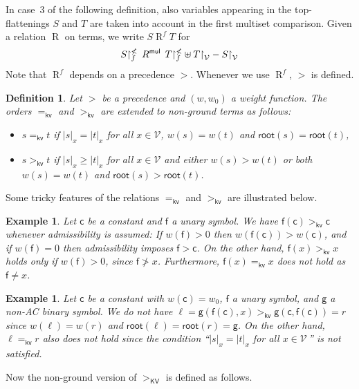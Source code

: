 \documentclass{tlp}
\newtheorem{definition}[theorem]{Definition}
\newtheorem{example}[theorem]{Example}
\newcommand{\m}[1]{\mathsf{#1}}
\newcommand{\mc}[1]{\mathcal{#1}}
\newcommand{\mr}[1]{\mathrm{#1}}
\newcommand{\rt}{\m{root}}
\newcommand{\Wt}{\m{w,root}}
\renewcommand{\Wt}{\m{kv}}
\newcommand{\mul}{\m{mul}}
\newcommand{\VV}{\mc{V}}
\newcommand{\KV}{\mr{\m{KV}}}
\newcommand{\rrs}[3][f]{{#2}{\restriction}^{\smash{#3}}_{#1}}
\newcommand{\REL}{\mathrel{R}}
\begin{document}
In case~3 of the following definition, also variables appearing
in the top\hyp flattenings $S$ and $T$ are taken into account in the
first multiset comparison.
Given a relation $\REL$ on terms, we write 
$S \REL^f T$ for
\[
\rrs{S}{\nless}\,\REL^\mul\,\rrs{T}{\nless}
\uplus T{\restriction}_\VV - S{\restriction}_\VV
\]
Note that $\REL^f$ depends on a precedence $>$. Whenever we
use $\REL^f$, $>$ is defined.

\begin{definition}
\label{def:kv}
Let $>$ be a precedence and $(w,w_0)$ a weight function.
The orders $=_\Wt$ and $>_\Wt$ are extended to non-ground terms
as follows:
\begin{itemize}
\item
$s =_\Wt t$ if $|s|_x = |t|_x$ for all $x \in \VV$,
$w(s) = w(t)$ and $\rt(s) = \rt(t)$,
\item
$s >_\Wt t$ if $|s|_x \geqslant |t|_x$ for all $x \in \VV$ and
either $w(s) > w(t)$ or both $w(s) = w(t)$ and $\rt(s) > \rt(t)$.
\end{itemize}
\end{definition}

Some tricky features of the relations $=_\Wt$ and $>_\Wt$ are
illustrated below.

\begin{example}
\label{counterexample preliminary}
Let $\m{c}$ be a constant and $\m{f}$ a unary symbol.
We have $\m{f}(\m{c}) >_\Wt \m{c}$
whenever admissibility is assumed:
If $w(\m{f}) > 0$ then $w(\m{f}(\m{c})) > w(\m{c})$,
and if $w(\m{f}) = 0$ then admissibility imposes $\m{f} > \m{c}$.
On the other hand, $\m{f}(x) >_\Wt x$ holds only if $w(\m{f}) > 0$,
since $\m{f} \ngtr x$.
Furthermore, $\m{f}(x) =_\Wt x$ does not hold as
$\m{f} \neq x$.
\end{example}

\begin{example}
\label{counterexample2 preliminary}
Let $\m{c}$ be a constant with $w(\m{c}) = w_0$, $\m{f}$ a unary symbol,
and $\m{g}$ a non-AC binary symbol.
We do not have
$\ell = \m{g}(\m{f}(\m{c}),x) >_\Wt \m{g}(\m{c},\m{f}(\m{c})) = r$
since $w(\ell) = w(r)$ and $\rt(\ell) = \rt(r) = \m{g}$.
On the other hand, $\ell =_\Wt r$ also does not hold
since the condition ``$|s|_x = |t|_x$ for all $x \in \VV$\,'' is not
satisfied.
\end{example}

Now the non-ground version of $>_\KV$ is defined as follows.
\end{document}
